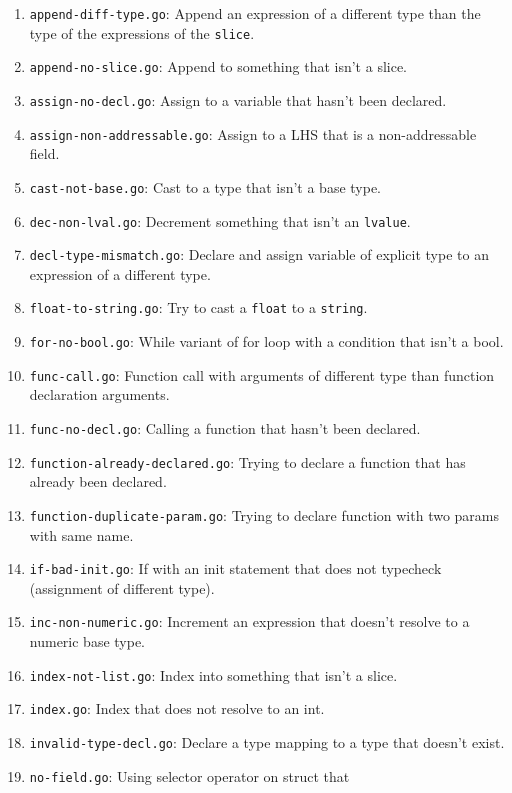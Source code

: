 \documentclass[11pt]{article}
\begin{document}
\begin{enumerate}
\item \texttt{append-diff-type.go}: Append an expression of a
  different type than the type of the expressions of the
  \texttt{slice}.
\item \texttt{append-no-slice.go}: Append to something that isn't a
  slice.
\item \texttt{assign-no-decl.go}: Assign to a variable that hasn't
  been declared.
\item \texttt{assign-non-addressable.go}: Assign to a LHS that is a
  non-addressable field.
\item \texttt{cast-not-base.go}: Cast to a type that isn't a base
  type.
\item \texttt{dec-non-lval.go}: Decrement something that isn't an
  \texttt{lvalue}.
\item \texttt{decl-type-mismatch.go}: Declare and assign variable of
  explicit type to an expression of a different type.
\item \texttt{float-to-string.go}: Try to cast a \texttt{float} to a
  \texttt{string}.
\item \texttt{for-no-bool.go}: While variant of for loop with a
  condition that isn't a bool.
\item \texttt{func-call.go}: Function call with arguments of different
  type than function declaration arguments.
\item \texttt{func-no-decl.go}: Calling a function that hasn't been
  declared.
\item \texttt{function-already-declared.go}: Trying to declare a
  function that has already been declared.
\item \texttt{function-duplicate-param.go}: Trying to declare function
  with two params with same name.
\item \texttt{if-bad-init.go}: If with an init statement that does not
  typecheck (assignment of different type).
\item \texttt{inc-non-numeric.go}: Increment an expression that
  doesn't resolve to a numeric base type.
\item \texttt{index-not-list.go}: Index into something that isn't a
  slice.
\item \texttt{index.go}: Index that does not resolve to an int.
\item \texttt{invalid-type-decl.go}: Declare a type mapping to a type
  that doesn't exist.
\item \texttt{no-field.go}: Using selector operator on struct that

\end{enumerate}
\end{document}
